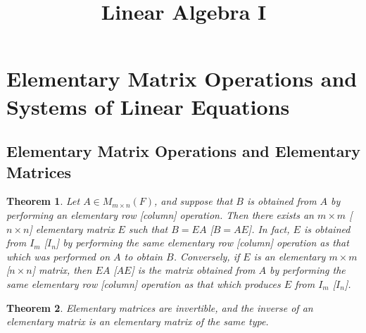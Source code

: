 \documentclass{article}
\title{\textbf{Linear Algebra I}}
\theoremstyle{plain}
\newtheorem{theorem}{Theorem}[section]
\begin{document}
\maketitle
\setcounter{section}{2}
\section{Elementary Matrix Operations and Systems of Linear Equations}
\subsection{Elementary Matrix Operations and Elementary Matrices}
\begin{theorem}
    Let \( A \in M_{m \times n}(F) \), and suppose that \( B \) is obtained from \( A \) by performing an elementary row [column] operation. Then there exists an \( m \times m \) [\( n \times n \)] elementary matrix \( E \) such that \( B = EA \) [\( B = AE \)]. In fact, \( E \) is obtained from \( I_m \) [\( I_n \)] by performing the same elementary row [column] operation as that which was performed on \( A \) to obtain \( B \). Conversely, if \( E \) is an elementary \( m \times m \) [\( n \times n \)] matrix, then \( EA \) [\( AE \)] is the matrix obtained from \( A \) by performing the same elementary row [column] operation as that which produces \( E \) from \( I_m \) [\( I_n \)].
\end{theorem}

\begin{theorem}
    Elementary matrices are invertible, and the inverse of an elementary matrix is an elementary matrix of the same type.
\end{theorem}
\end{document}
